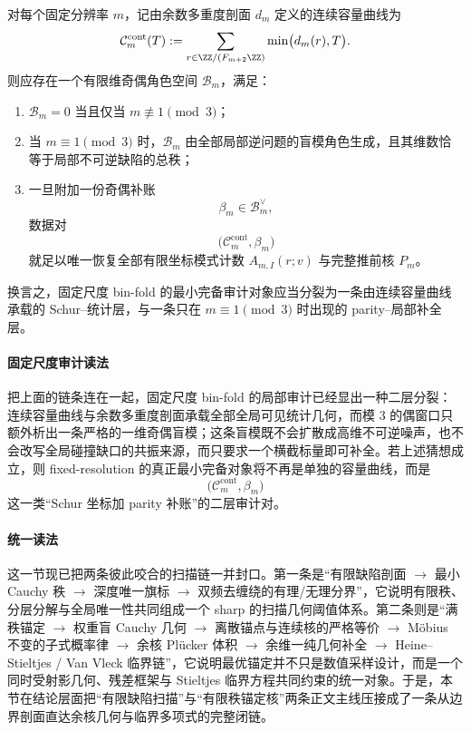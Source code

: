 \begin{conjecture}\label{conj:conclusion-fixedscale-capacity-parity-two-layer-audit}
对每个固定分辨率 \(m\)，记由余数多重度剖面 \(d_m\) 定义的连续容量曲线为
\[
\mathcal C_m^{\mathrm{cont}}(T):=\sum_{r\in \ZZ/(F_{m+2}\ZZ)}\min\bigl(d_m(r),T\bigr).
\]
则应存在一个有限维奇偶角色空间 \(\mathcal B_m\)，满足：
\begin{enumerate}
  \item \(\mathcal B_m=0\) 当且仅当 \(m\not\equiv 1\pmod 3\)；
  \item 当 \(m\equiv 1\pmod 3\) 时，\(\mathcal B_m\) 由全部局部逆问题的盲模角色生成，且其维数恰等于局部不可逆缺陷的总秩；
  \item 一旦附加一份奇偶补账
  \[
  \beta_m\in \mathcal B_m^\vee,
  \]
  数据对
  \[
  \bigl(\mathcal C_m^{\mathrm{cont}},\beta_m\bigr)
  \]
  就足以唯一恢复全部有限坐标模式计数 \(A_{m,I}(r;v)\) 与完整推前核 \(P_m\)。
\end{enumerate}
换言之，固定尺度 bin-fold 的最小完备审计对象应当分裂为一条由连续容量曲线承载的 Schur--统计层，与一条只在 \(m\equiv 1\pmod 3\) 时出现的 parity--局部补全层。
\end{conjecture}

\paragraph{固定尺度审计读法}
把上面的链条连在一起，固定尺度 bin-fold 的局部审计已经显出一种二层分裂：连续容量曲线与余数多重度剖面承载全部全局可见统计几何，而模 \(3\) 的偶窗口只额外析出一条严格的一维奇偶盲模；这条盲模既不会扩散成高维不可逆噪声，也不会改写全局碰撞缺口的共振来源，而只要求一个横截标量即可补全。若上述猜想成立，则 fixed-resolution 的真正最小完备对象将不再是单独的容量曲线，而是
\[
\bigl(\mathcal C_m^{\mathrm{cont}},\beta_m\bigr)
\]
这一类“Schur 坐标加 parity 补账”的二层审计对。





\paragraph{统一读法}
这一节现已把两条彼此咬合的扫描链一并封口。第一条是“有限缺陷剖面 \(\to\) 最小 Cauchy 秩 \(\to\) 深度唯一旗标 \(\to\) 双频去缠绕的有理/无理分界”，它说明有限秩、分层分解与全局唯一性共同组成一个 sharp 的扫描几何阈值体系。第二条则是“满秩锚定 \(\to\) 权重盲 Cauchy 几何 \(\to\) 离散锚点与连续核的严格等价 \(\to\) Möbius 不变的子式概率律 \(\to\) 余核 Pl\"ucker 体积 \(\to\) 余维一纯几何补全 \(\to\) Heine--Stieltjes / Van Vleck 临界链”，它说明最优锚定并不只是数值采样设计，而是一个同时受射影几何、残差框架与 Stieltjes 临界方程共同约束的统一对象。于是，本节在结论层面把“有限缺陷扫描”与“有限秩锚定核”两条正文主线压接成了一条从边界剖面直达余核几何与临界多项式的完整闭链。

\endinput
